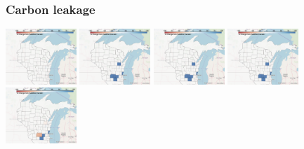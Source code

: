 \documentclass[xcolor=dvipsnames]{beamer}
\begin{document}
\begin{frame}
  \frametitle{Carbon leakage}


  \includegraphics[width=0.2\textwidth]{includes/no_leakage_CC_r0.png}
  \includegraphics[width=0.2\textwidth]{includes/no_leakage_CC_r1.png}
  \includegraphics[width=0.2\textwidth]{includes/no_leakage_CC_r2.png}
  \includegraphics[width=0.2\textwidth]{includes/no_leakage_CC_r3.png}
  \includegraphics[width=0.2\textwidth]{includes/no_leakage_CC_r4.png}

\end{frame}
\end{document}
